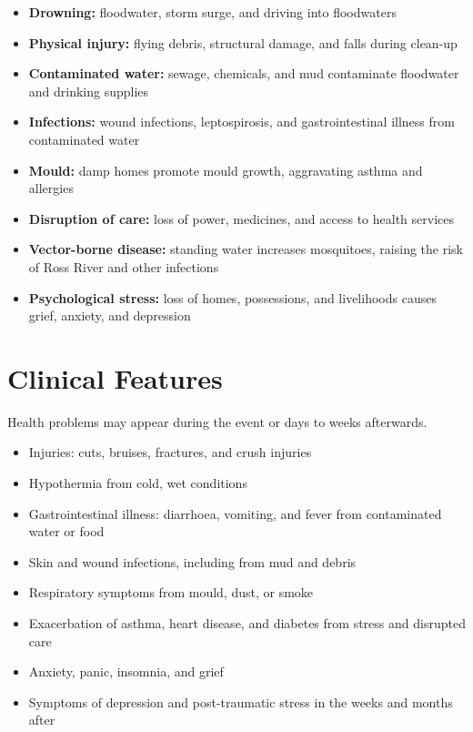 \begin{itemize}
    \item \textbf{Drowning:} floodwater, storm surge, and driving into floodwaters
    \item \textbf{Physical injury:} flying debris, structural damage, and falls during clean-up
    \item \textbf{Contaminated water:} sewage, chemicals, and mud contaminate floodwater and drinking supplies
    \item \textbf{Infections:} wound infections, leptospirosis, and gastrointestinal illness from contaminated water
    \item \textbf{Mould:} damp homes promote mould growth, aggravating asthma and allergies
    \item \textbf{Disruption of care:} loss of power, medicines, and access to health services
    \item \textbf{Vector-borne disease:} standing water increases mosquitoes, raising the risk of Ross River and other infections
    \item \textbf{Psychological stress:} loss of homes, possessions, and livelihoods causes grief, anxiety, and depression
\end{itemize}

\section*{Clinical Features}
Health problems may appear during the event or days to weeks afterwards.

\begin{itemize}
    \item Injuries: cuts, bruises, fractures, and crush injuries
    \item Hypothermia from cold, wet conditions
    \item Gastrointestinal illness: diarrhoea, vomiting, and fever from contaminated water or food
    \item Skin and wound infections, including from mud and debris
    \item Respiratory symptoms from mould, dust, or smoke
    \item Exacerbation of asthma, heart disease, and diabetes from stress and disrupted care
    \item Anxiety, panic, insomnia, and grief
    \item Symptoms of depression and post-traumatic stress in the weeks and months after
\end{itemize}

